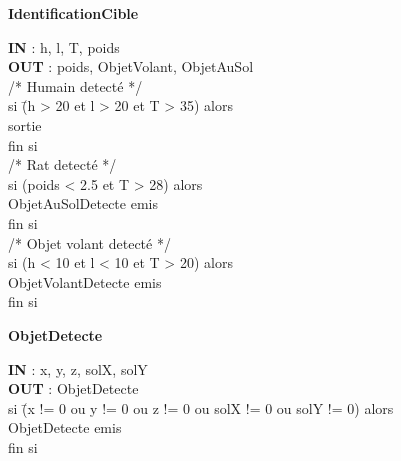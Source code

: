 \begin{description}
	
	\item \textbf{IdentificationCible}
		\begin{tabbing} 
		\textbf{IN} : h, l, T, poids \\
		\textbf{OUT} : poids, ObjetVolant, ObjetAuSol \\			
		/* Humain detecté */ \\
		si \=(h > 20 et l > 20 et T > 35) alors \\
			\>sortie \\
		fin si \\
		/* Rat detecté */ \\
		si (poids < 2.5 et T > 28) alors \\
			\>ObjetAuSolDetecte emis \\
		fin si \\
		/* Objet volant detecté */ \\
		si (h < 10 et l < 10 et T > 20) alors \\
			\>ObjetVolantDetecte emis \\
		fin si 
		\end{tabbing}
			

	\item \textbf{ObjetDetecte}
		\begin{tabbing} 
		\textbf{IN} : x, y, z, solX, solY \\
		\textbf{OUT} : ObjetDetecte \\
		si \=(x != 0 ou y != 0 ou z != 0 ou solX != 0 ou solY != 0) alors \\
		\>ObjetDetecte emis \\
		fin si
		\end{tabbing} 

\end{description}

\vfill
\pagebreak


